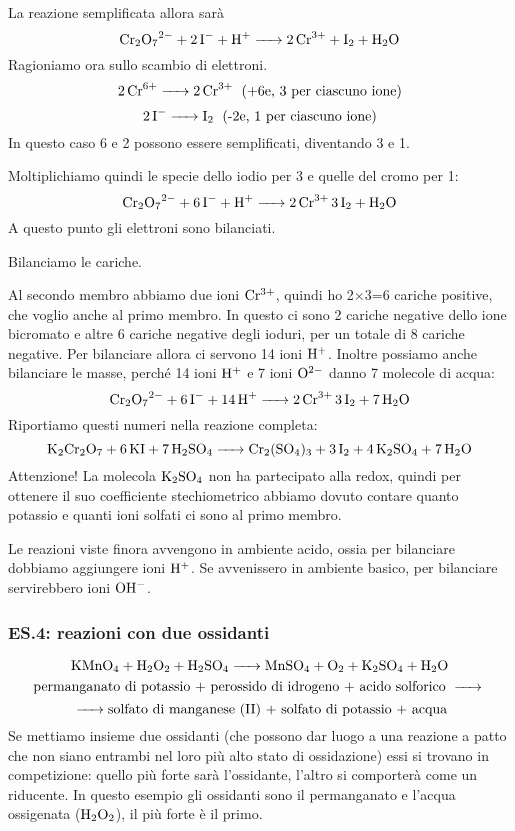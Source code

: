 La reazione semplificata allora sarà
$$\ce{Cr_2O_7^2- + 2I^- + H+ -> 2Cr^3+ + I_2 + H_2O}$$
Ragioniamo ora sullo scambio di elettroni.
$$\ce{2Cr^6+ -> 2Cr^3+ \; \text{(+6e, 3 per ciascuno ione)}}$$
$$\ce{2I- -> I_2 \; \text{(-2e, 1 per ciascuno ione)}}$$
In questo caso 6 e 2 possono essere semplificati, diventando 3 e 1.

Moltiplichiamo quindi le specie dello iodio per 3 e quelle del cromo per 1:
$$\ce{Cr_2O_7^2- + 6I^- + H+ -> 2Cr^3+ 3I_2 + H_2O}$$
A questo punto gli elettroni sono bilanciati.

Bilanciamo le cariche.

Al secondo membro abbiamo due ioni $\rm Cr^{3+}$, quindi ho 2$\times$3=6 cariche positive, che voglio anche al primo membro. In questo ci sono 2 cariche negative dello ione bicromato e altre 6 cariche negative degli ioduri, per un totale di 8 cariche negative. Per bilanciare allora ci servono 14 ioni $\rm H^+$. Inoltre possiamo anche bilanciare le masse, perché 14 ioni $\rm H^+$ e 7 ioni $\rm O^{2-}$ danno 7 molecole di acqua:
$$\ce{Cr_2O_7^2- + 6I^- + 14H+ -> 2Cr^3+ 3I_2 + 7H_2O}$$
Riportiamo questi numeri nella reazione completa:
$$\ce{K_2Cr_2O_7 + 6KI + 7H_2SO_4 -> Cr_2(SO_4)_3 + 3I_2 + 4K_2SO_4 + 7H_2O}$$
Attenzione! La molecola $\rm K_2SO_4$ non ha partecipato alla redox, quindi per ottenere il suo coefficiente stechiometrico abbiamo dovuto contare quanto potassio e quanti ioni solfati ci sono al primo membro.

\vspace{0.2cm}Le reazioni viste finora avvengono in ambiente acido, ossia per bilanciare dobbiamo aggiungere ioni $\rm H^+$. Se avvenissero in ambiente basico, per bilanciare servirebbero ioni $\rm OH^-$.
\subsubsection{\textbf{ES.4: reazioni con due ossidanti}}
$$\ce{KMnO_4 + H_2O_2 + H_2SO_4 -> MnSO_4 + O_2 + K_2SO_4 + H_2O}$$
$$\text{permanganato di potassio + perossido di idrogeno + acido solforico }\ce{->}$$
$$\ce{->}\text{solfato di manganese (II) + solfato di potassio + acqua}$$
Se mettiamo insieme due ossidanti (che possono dar luogo a una reazione a patto che non siano entrambi nel loro più alto stato di ossidazione) essi si trovano in competizione: quello più forte sarà l'ossidante, l'altro si comporterà come un riducente. In questo esempio gli ossidanti sono il permanganato e l'acqua ossigenata ($\rm H_2O_2$), il più forte è il primo.

